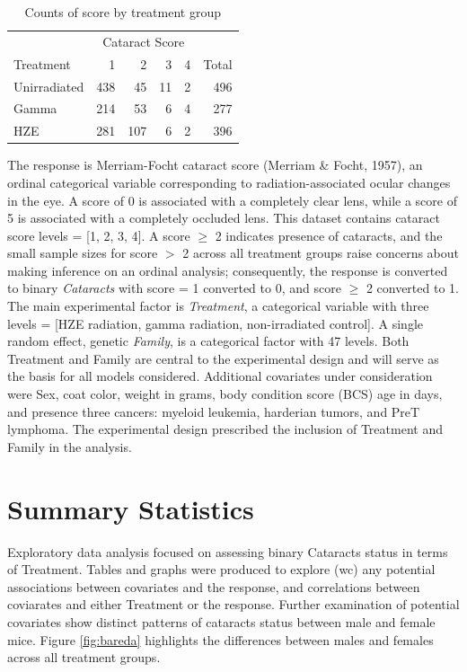 \documentclass[12pt]{article}
\begin{document}
\begin{table}
\centering
\begin{tabular}{lrrrrr}
  \toprule
\multicolumn{1}{c}{ } & \multicolumn{4}{c}{Cataract Score} & \multicolumn{1}{c}{ } \\
\cmidrule(l{3pt}r{3pt}){2-5}
Treatment & 1 & 2 & 3 & 4 & Total \\ 
  \midrule
Unirradiated & 438 &  45 &  11 &   2 & 496 \\ 
  Gamma & 214 &  53 &   6 &   4 & 277 \\ 
  HZE & 281 & 107 &   6 &   2 & 396 \\ 
   \bottomrule
\end{tabular}
\caption{Counts of score by treatment group} 
\end{table}

The response is Merriam-Focht cataract score (Merriam \& Focht, 1957), an ordinal categorical variable corresponding to radiation-associated ocular changes in the eye. A score of 0 is associated with a completely clear lens, while a score of 5 is associated with a completely occluded lens. This dataset contains cataract score levels = {[}1, 2, 3, 4{]}. A score \(\ge\) 2 indicates presence of cataracts, and the small sample sizes for score \(>\) 2 across all treatment groups raise concerns about making inference on an ordinal analysis; consequently, the response is converted to binary \emph{Cataracts} with score = 1 converted to 0, and score \(\ge\) 2 converted to 1. The main experimental factor is \emph{Treatment}, a categorical variable with three levels = {[}HZE radiation, gamma radiation, non-irradiated control{]}. A single random effect, genetic \emph{Family}, is a categorical factor with 47 levels. Both Treatment and Family are central to the experimental design and will serve as the basis for all models considered. Additional covariates under consideration were Sex, coat color, weight in grams, body condition score (BCS) age in days, and presence three cancers: myeloid leukemia, harderian tumors, and PreT lymphoma. The experimental design prescribed the inclusion of Treatment and Family in the analysis.

\section{Summary Statistics}
\label{sec:sumstats}

Exploratory data analysis focused on assessing binary Cataracts status in terms of Treatment. Tables and graphs were produced to explore (wc) any potential associations between covariates and the response, and correlations between coviarates and either Treatment or the response. Further examination of potential covariates show distinct patterns of cataracts status between male and female mice. Figure \ref{fig:bareda} highlights the differences between males and females across all treatment groups.
\end{document}
